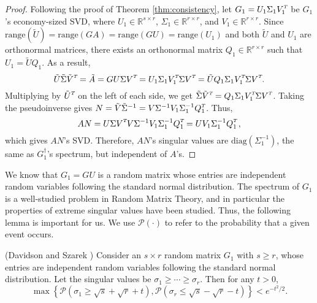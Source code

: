 \documentclass{siamltex}
\newcommand{\T}{^{\raisebox{0.09em}{\hbox{\tiny $T$}}\hspace{-0.1em}}}
\begin{document}
\begin{proof}
  Following the proof of Theorem \ref{thm:consistency}, let $G_1 = U_1 \Sigma_1
  V_1\T$ be $G_1$'s economy-sized SVD, where $U_1 \in \mathbb{R}^{s \times r}$,
  $\Sigma_1 \in \mathbb{R}^{r \times r}$, and $V_1 \in \mathbb{R}^{r \times
    r}$. Since $\text{range}(\tilde{U}) = \text{range}(GA) = \text{range}(GU) =
  \text{range}(U_1)$ and both $\tilde{U}$ and $U_1$ are orthonormal matrices,
  there exists an orthonormal matrix $Q_1 \in \mathbb{R}^{r \times r}$ such that
  $U_1 = \tilde{U} Q_1$.  As a result,
  \begin{equation*}
    \tilde{U} \tilde{\Sigma} \tilde{V}\T = \tilde{A} = G U \Sigma V\T = U_1 \Sigma_1 V_1\T \Sigma V\T = \tilde{U} Q_1 \Sigma_1 V_1\T \Sigma V\T. 
  \end{equation*}
  Multiplying by $\tilde{U}\T$ on the left of each side, we get $\tilde{\Sigma}
  \tilde{V}\T = Q_1 \Sigma_1 V_1\T \Sigma V\T$. Taking the pseudoinverse gives
  $N = \tilde{V} \tilde{\Sigma}^{-1} = V \Sigma^{-1} V_1 \Sigma_{1}^{-1} Q_1\T$.
  Thus,
  \begin{equation*}
    A N= U \Sigma V\T  V \Sigma^{-1} V_1 \Sigma_{1}^{-1} Q_1\T = U V_1 \Sigma_{1}^{-1} Q_1\T\,,
  \end{equation*}
  which gives $AN$'s SVD. Therefore, $A N$'s singular values are
  $\text{diag}(\Sigma_1^{-1})$, the same as $G_1^\dagger$'s spectrum, but
  independent of $A$'s.
\end{proof}

We know that $G_1 = G U$ is a random matrix whose entries are independent random
variables following the standard normal distribution.  The spectrum of $G_1$ is
a well-studied problem in Random Matrix Theory, and in particular the properties
of extreme singular values have been studied.  Thus, the following lemma is
important for us. We use $\mathcal{P}(\cdot)$ to refer to the probability that a
given event occurs.

\begin{lemma} 
  \label{lemma:concentration}\textnormal{(Davidson and Szarek \cite{davidson2001local})} Consider an $s \times r$ random matrix
  $G_1$ with $s \geq r$, whose entries are independent random variables following the
  standard normal distribution. Let the singular values be $\sigma_1 \geq \cdots \geq
  \sigma_r$. Then for any $t > 0$,
  \begin{equation}
    \label{eq:concentration}
    \max \left\{ \mathcal{P}(\sigma_1 \geq \sqrt{s} + \sqrt{r} + t), \mathcal{P}( \sigma_r \leq \sqrt{s} - \sqrt{r} - t) \right\} < e^{- t^2 / 2}.
  \end{equation}
\end{lemma}
\end{document}
